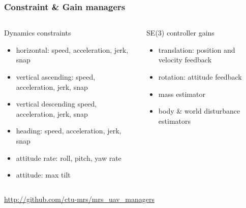 \documentclass[aspectratio=1610]{beamer}
\begin{document}


  \begin{frame}
    \frametitle{Constraint \& Gain managers}


    \begin{columns}[c]


      \begin{block}{Dynamics constraints}
        \begin{itemize}
          \item horizontal: speed, acceleration, jerk, snap
          \item vertical ascending: speed, acceleration, jerk, snap
          \item vertical descending speed, acceleration, jerk, snap
          \item heading: speed, acceleration, jerk, snap
          \item attitude rate: roll, pitch, yaw rate
          \item attitude: max tilt
        \end{itemize}
      \end{block}

      \begin{block}{SE(3) controller gains}
        \begin{itemize}
          \item translation: position and velocity feedback
          \item rotation: attitude feedback
          \item mass estimator
          \item body \& world disturbance estimators
        \end{itemize}
      \end{block}
    \end{columns}

    \begin{block}{\cite{baca2020mrs}}
      \url{http://github.com/ctu-mrs/mrs_uav_managers}
    \end{block}

  \end{frame}
\end{document}
